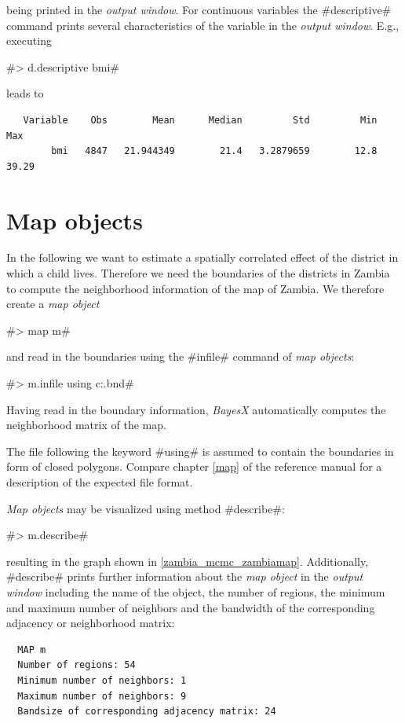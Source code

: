 \documentclass[11pt,a4paper,twoside]{bayesxreport}
\begin{document}
being printed in the {\it output window}. For continuous variables
the #descriptive# command prints several characteristics of the
variable in the {\em output window}. E.g., executing

#> d.descriptive bmi#

leads to

\begin{verbatim}
   Variable    Obs        Mean      Median         Std         Min         Max
        bmi   4847   21.944349        21.4   3.2879659        12.8       39.29
\end{verbatim}

\section{Map objects}\label{zambia_mcmc_maps}

In the following we want to estimate a spatially correlated effect
of the district in which a child lives. Therefore we need the
boundaries of the districts in Zambia to compute the neighborhood
information of the map of Zambia. We therefore create a {\it map
object}

#> map m#

and read in the boundaries using the #infile# command of {\it map
objects}:

#> m.infile using c:\data\zambia.bnd#

Having read in the boundary information, {\it BayesX} automatically
computes the neighborhood matrix of the map.

The file following the keyword #using# is assumed to contain the
boundaries in form of closed polygons. Compare chapter \ref*{map} of
the reference manual for a description of the expected file format.

{\it Map objects} may be visualized using method #describe#:

#> m.describe#

resulting in the graph shown in \autoref{zambia_mcmc_zambiamap}.
Additionally, #describe# prints further information about the {\it
map object} in the {\it output window} including the name of the
object, the number of regions, the minimum and maximum number of
neighbors and the bandwidth of the corresponding adjacency or
neighborhood matrix:

\begin{verbatim}
  MAP m
  Number of regions: 54
  Minimum number of neighbors: 1
  Maximum number of neighbors: 9
  Bandsize of corresponding adjacency matrix: 24
\end{verbatim}
\end{document}
